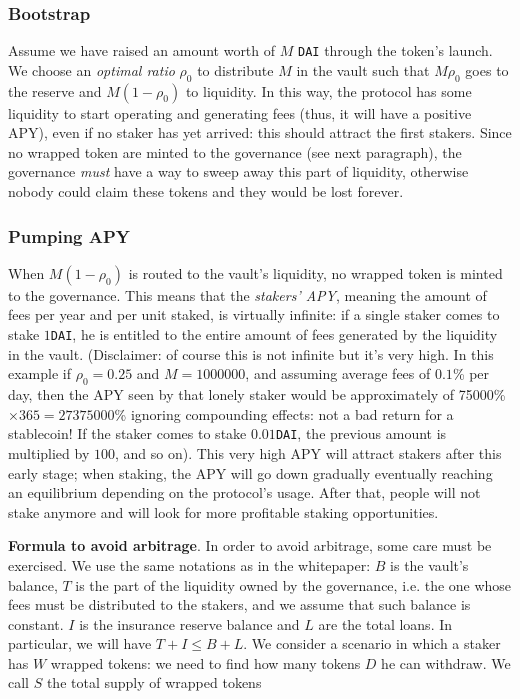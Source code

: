 \documentclass[a4paper,10 pt]{article}
\theoremstyle{definition}
\begin{document}
\subsubsection{Bootstrap}\label{bootstrap}

Assume we have raised an amount worth of $M$ \verb|DAI| through the token's launch. We choose an {\it optimal ratio} $\rho_0$ to distribute $M$ in the vault such that $M\rho_0$ goes to the reserve and $M(1-\rho_0)$ to liquidity. In this way, the protocol has some liquidity to start operating and generating fees (thus, it will have a positive APY), even if no staker has yet arrived: this should attract the first stakers. Since no wrapped token are minted to the governance (see next paragraph), the governance {\it must} have a way to sweep away this part of liquidity, otherwise nobody could claim these tokens and they would be lost forever.

\subsubsection{Pumping APY}
When $M(1-\rho_0)$ is routed to the vault's liquidity, no wrapped token is minted to the governance. This means that the {\it stakers' APY}, meaning the amount of fees per year and per unit staked, is virtually infinite: if a single staker comes to stake $1$\verb|DAI|, he is entitled to the entire amount of fees generated by the liquidity in the vault. (Disclaimer: of course this is not infinite but it's very high. In this example if $\rho_0 = 0.25$ and $M = 1000000$, and assuming average fees of $0.1$\% per day, then the APY seen by that lonely staker would be approximately of 75000\% $\times 365 = 27375000$\% ignoring compounding effects: not a bad return for a stablecoin! If the staker comes to stake $0.01$\verb|DAI|, the previous amount is multiplied by $100$, and so on).
This very high APY will attract stakers after this early stage; when staking, the APY will go down gradually eventually reaching an equilibrium depending on the protocol's usage. After that, people will not stake anymore and will look for more profitable staking opportunities.

{\bf Formula to avoid arbitrage}. In order to avoid arbitrage, some care must be exercised. We use the same notations as in the whitepaper: $B$ is the vault's balance, $T$ is the part of the liquidity owned by the governance, i.e. the one whose fees must be distributed to the stakers, and we assume that such balance is constant. $I$ is the insurance reserve balance and $L$ are the total loans. In particular, we will have $T + I \le B + L$. We consider a scenario in which a staker has $W$ wrapped tokens: we need to find how many tokens $D$ he can withdraw. We call $S$ the total supply of wrapped tokens
\end{document}

